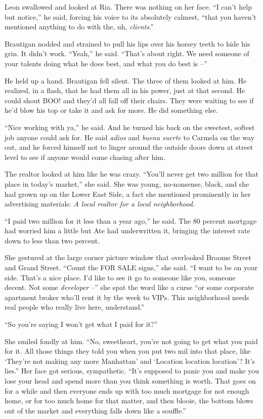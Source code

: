 Leon swallowed and looked at Ria. There was nothing on her face. “I 
can't help but notice,” he said, forcing his voice to its absolutely 
calmest, “that you haven't mentioned anything to do with the, uh, 
\emph{clients}.”

Brautigan nodded and strained to pull his lips over his horsey teeth to 
hide his grin. It didn't work. “Yeah,” he said. “That's about 
right. We need someone of your talents doing what he does best, and 
what you do best is --”

He held up a hand. Brautigan fell silent. The three of them looked at 
him. He realized, in a flash, that he had them all in his power, just 
at that second. He could shout BOO! and they'd all fall off their 
chairs. They were waiting to see if he'd blow his top or take it and 
ask for more. He did something else.

“Nice working with ya,” he said. And he turned his back on the 
sweetest, softest job anyone could ask for. He said \emph{adios} and 
\emph{buena suerte} to Carmela on the way out, and he forced himself 
not to linger around the outside doors down at street level to see if 
anyone would come chasing after him.

\tb

The realtor looked at him like he was crazy. “You'll never get two 
million for that place in today's market,” she said. She was young, 
no-nonsense, black, and she had grown up on the Lower East Side, a fact 
she mentioned prominently in her advertising materials: \emph{A local 
realtor for a local neighborhood.}

“I paid two million for it less than a year ago,” he said. The 80 
percent mortgage had worried him a little but Ate had underwritten it, 
bringing the interest rate down to less than two percent.

She gestured at the large corner picture window that overlooked Broome 
Street and Grand Street. “Count the FOR SALE signs,” she said. “I 
want to be on your side. That's a nice place. I'd like to see it go to 
someone like you, someone decent. Not some \emph{developer} --” she 
spat the word like a curse “or some corporate apartment broker who'll 
rent it by the week to VIPs. This neighborhood needs real people who 
really live here, understand.”

“So you're saying I won't get what I paid for it?”

She smiled fondly at him. “No, sweetheart, you're not going to get 
what you paid for it. All those things they told you when you put two 
mil into that place, like `They're not making any more Manhattan' and 
`Location location location'? It's lies.” Her face got serious, 
sympathetic. “It's supposed to panic you and make you lose your head 
and spend more than you think something is worth. That goes on for a 
while and then everyone ends up with too much mortgage for not enough 
home, or for too much home for that matter, and then blooie, the bottom 
blows out of the market and everything falls down like a souffle.”

